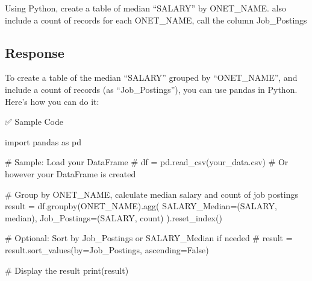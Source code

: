 \documentclass[
  letterpaper,
  DIV=11,
  numbers=noendperiod]{scrartcl}
\newenvironment{Shaded}{\begin{snugshade}}{\end{snugshade}}
\newcommand{\BuiltInTok}[1]{\textcolor[rgb]{0.00,0.23,0.31}{#1}}
\newcommand{\CommentTok}[1]{\textcolor[rgb]{0.37,0.37,0.37}{#1}}
\newcommand{\ImportTok}[1]{\textcolor[rgb]{0.00,0.46,0.62}{#1}}
\newcommand{\NormalTok}[1]{\textcolor[rgb]{0.00,0.23,0.31}{#1}}
\newcommand{\OperatorTok}[1]{\textcolor[rgb]{0.37,0.37,0.37}{#1}}
\newcommand{\StringTok}[1]{\textcolor[rgb]{0.13,0.47,0.30}{#1}}
\begin{document}
Using Python, create a table of median ``SALARY'' by ONET\_NAME. also
include a count of records for each ONET\_NAME, call the column
Job\_Postings

\subsection{Response}\label{response-2}

To create a table of the median ``SALARY'' grouped by ``ONET\_NAME'',
and include a count of records (as ``Job\_Postings''), you can use
pandas in Python. Here's how you can do it:

✅ Sample Code

\begin{Shaded}
\begin{Highlighting}[]
\ImportTok{import}\NormalTok{ pandas }\ImportTok{as}\NormalTok{ pd}

\CommentTok{\# Sample: Load your DataFrame}
\CommentTok{\# df = pd.read\_csv(\textquotesingle{}your\_data.csv\textquotesingle{})  \# Or however your DataFrame is created}

\CommentTok{\# Group by ONET\_NAME, calculate median salary and count of job postings}
\NormalTok{result }\OperatorTok{=}\NormalTok{ df.groupby(}\StringTok{\textquotesingle{}ONET\_NAME\textquotesingle{}}\NormalTok{).agg(}
\NormalTok{    SALARY\_Median}\OperatorTok{=}\NormalTok{(}\StringTok{\textquotesingle{}SALARY\textquotesingle{}}\NormalTok{, }\StringTok{\textquotesingle{}median\textquotesingle{}}\NormalTok{),}
\NormalTok{    Job\_Postings}\OperatorTok{=}\NormalTok{(}\StringTok{\textquotesingle{}SALARY\textquotesingle{}}\NormalTok{, }\StringTok{\textquotesingle{}count\textquotesingle{}}\NormalTok{)}
\NormalTok{).reset\_index()}

\CommentTok{\# Optional: Sort by Job\_Postings or SALARY\_Median if needed}
\CommentTok{\# result = result.sort\_values(by=\textquotesingle{}Job\_Postings\textquotesingle{}, ascending=False)}

\CommentTok{\# Display the result}
\BuiltInTok{print}\NormalTok{(result)}

\end{Highlighting}
\end{Shaded}
\end{document}
